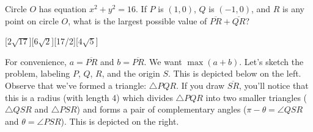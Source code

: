\documentclass[12pt]{article}
\newcounter{problem}
\begin{document}
\begin{problem}
   Circle $O$ has equation $x^2 + y^2 = 16$. If $P$ is $(1,0)$, $Q$ is $(-1,0)$, and $R$ is any point on circle $O$, what is the largest possible value of $\overline{PR} + \overline{QR}$?
\end{problem}
[$2\sqrt{17}$][$6\sqrt{2}$][17/2][$4\sqrt{5}$]
\begin{solution}[B]
   For convenience, $a=\overline{PR}$ and $b=\overline{PR}$. We want $\max(a+b)$. Let's sketch the problem, labeling $P$, $Q$, $R$, and the origin $S$. This is depicted below on the left. \medbreak
    Observe that we've formed a triangle: $\triangle PQR$. If you draw $\overline{SR}$, you'll notice that this is a radius (with length 4) which divides $\triangle PQR$ into two smaller triangles ($\triangle QSR$ and $\triangle PSR$) and forms a pair of complementary angles ($\pi - \theta=\angle QSR$ and $\theta=\angle PSR$). This is depicted on the right.
    
    \begin{minipage}[t][][]{0.47\textwidth}\vspace{0pt}
        \begin{center}
\end{center}
\end{minipage}
\end{solution}
\end{document}
